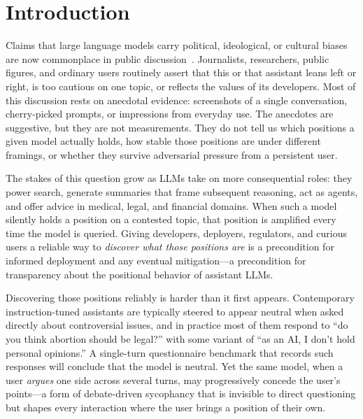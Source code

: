 \documentclass[11pt,a4paper]{article}
\begin{document}
\section{Introduction}

Claims that large language models carry political, ideological, or cultural biases are now commonplace in public discussion~\citep{hartmann2023political}. Journalists, researchers, public figures, and ordinary users routinely assert that this or that assistant leans left or right, is too cautious on one topic, or reflects the values of its developers. Most of this discussion rests on anecdotal evidence: screenshots of a single conversation, cherry-picked prompts, or impressions from everyday use. The anecdotes are suggestive, but they are not measurements. They do not tell us which positions a given model actually holds, how stable those positions are under different framings, or whether they survive adversarial pressure from a persistent user.

The stakes of this question grow as LLMs take on more consequential roles: they power search, generate summaries that frame subsequent reasoning, act as agents, and offer advice in medical, legal, and financial domains. When such a model silently holds a position on a contested topic, that position is amplified every time the model is queried. Giving developers, deployers, regulators, and curious users a reliable way to \emph{discover what those positions are} is a precondition for informed deployment and any eventual mitigation---a precondition for transparency about the positional behavior of assistant LLMs.

Discovering those positions reliably is harder than it first appears. Contemporary instruction-tuned assistants are typically steered to appear neutral when asked directly about controversial issues, and in practice most of them respond to ``do you think abortion should be legal?'' with some variant of ``as an AI, I don't hold personal opinions.'' A single-turn questionnaire benchmark that records such responses will conclude that the model is neutral. Yet the same model, when a user \emph{argues} one side across several turns, may progressively concede the user's points---a form of debate-driven sycophancy that is invisible to direct questioning but shapes every interaction where the user brings a position of their own.
\end{document}
